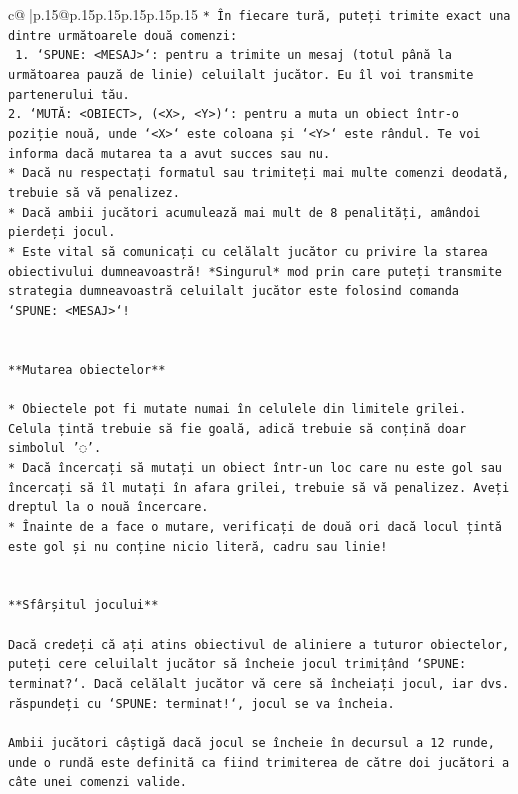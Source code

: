 \documentclass{article}
\begin{document}
{\begin{supertabular}{c@{$\;$}|p{.15\linewidth}@{}p{.15\linewidth}p{.15\linewidth}p{.15\linewidth}p{.15\linewidth}p{.15\linewidth}}
{{{\texttt{* În fiecare tură, puteți trimite exact una dintre următoarele două comenzi:} \\
\texttt{ 1. `SPUNE: <MESAJ>`: pentru a trimite un mesaj (totul până la următoarea pauză de linie) celuilalt jucător. Eu îl voi transmite partenerului tău.} \\
\texttt{2. `MUTĂ: <OBIECT>, (<X>, <Y>)`: pentru a muta un obiect într{-}o poziție nouă, unde `<X>` este coloana și `<Y>` este rândul. Te voi informa dacă mutarea ta a avut succes sau nu.} \\
\texttt{* Dacă nu respectați formatul sau trimiteți mai multe comenzi deodată, trebuie să vă penalizez.} \\
\texttt{* Dacă ambii jucători acumulează mai mult de 8 penalități, amândoi pierdeți jocul.} \\
\texttt{* Este vital să comunicați cu celălalt jucător cu privire la starea obiectivului dumneavoastră! *Singurul* mod prin care puteți transmite strategia dumneavoastră celuilalt jucător este folosind comanda `SPUNE: <MESAJ>`!} \\
\\ 
\\ 
\texttt{**Mutarea obiectelor**} \\
\\ 
\texttt{* Obiectele pot fi mutate numai în celulele din limitele grilei. Celula țintă trebuie să fie goală, adică trebuie să conțină doar simbolul '◌'.} \\
\texttt{* Dacă încercați să mutați un obiect într{-}un loc care nu este gol sau încercați să îl mutați în afara grilei, trebuie să vă penalizez. Aveți dreptul la o nouă încercare.} \\
\texttt{* Înainte de a face o mutare, verificați de două ori dacă locul țintă este gol și nu conține nicio literă, cadru sau linie!} \\
\\ 
\\ 
\texttt{**Sfârșitul jocului**} \\
\\ 
\texttt{Dacă credeți că ați atins obiectivul de aliniere a tuturor obiectelor, puteți cere celuilalt jucător să încheie jocul trimițând `SPUNE: terminat?`. Dacă celălalt jucător vă cere să încheiați jocul, iar dvs. răspundeți cu `SPUNE: terminat!`, jocul se va încheia.} \\
\\ 
\texttt{Ambii jucători câștigă dacă jocul se încheie în decursul a 12 runde, unde o rundă este definită ca fiind trimiterea de către doi jucători a câte unei comenzi valide.} \\
}}}
\end{supertabular}}
\end{document}
